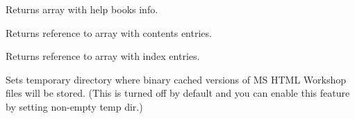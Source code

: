 Returns array with help books info.

\label{wxhtmlhelpdatagetcontentsarray}


Returns reference to array with contents entries.

\label{wxhtmlhelpdatagetindexarray}


Returns reference to array with index entries.

\label{wxhtmlhelpdatasettempdir}


Sets temporary directory where binary cached versions of MS HTML Workshop
files will be stored. (This is turned off by default and you can enable
this feature by setting non-empty temp dir.)


